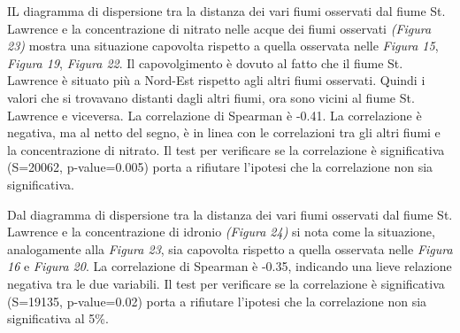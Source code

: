 \documentclass{article} %
\begin{document}
IL diagramma di dispersione tra la distanza dei vari fiumi osservati dal fiume St. Lawrence e la concentrazione di nitrato nelle acque dei fiumi osservati \textit{(Figura 23)} mostra una situazione capovolta rispetto a quella osservata nelle \textit{Figura 15}, \textit{Figura 19}, \textit{Figura 22}.
Il capovolgimento è dovuto al fatto che il fiume St. Lawrence è situato più a Nord-Est rispetto agli altri fiumi osservati. Quindi i valori che si trovavano distanti dagli altri fiumi, ora sono vicini al fiume St. Lawrence e viceversa. 
La correlazione di Spearman è -0.41. La correlazione è negativa, ma al netto del segno, è in linea con le correlazioni tra gli altri fiumi e la concentrazione di nitrato.  
Il test per verificare se la correlazione è significativa (S=20062, p-value=0.005) porta a rifiutare l'ipotesi che la correlazione non sia significativa.

Dal diagramma di dispersione tra la distanza dei vari fiumi osservati dal fiume St. Lawrence e la concentrazione di idronio \textit{(Figura 24)} si nota come la situazione, analogamente alla \textit{Figura 23}, sia capovolta rispetto a quella osservata nelle \textit{Figura 16} e \textit{Figura 20}.
La correlazione di Spearman è -0.35, indicando una lieve relazione negativa tra le due variabili. 
Il test per verificare se la correlazione è significativa (S=19135, p-value=0.02) porta a rifiutare l'ipotesi che la correlazione non sia significativa al 5\%.
\end{document}
